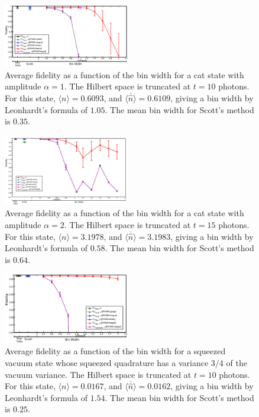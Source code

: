 \documentclass[
reprint,
superscriptaddress,
showpacs,
amsmath,
amssymb,
aps,
pra,
longbibliography
]{revtex4-1}
\begin{document}
\begin{figure}
  \includegraphics[width=0.49\textwidth]{catstate-alpha=1-10photons.eps}
  \caption{Average fidelity as a function of the bin width for a cat
    state with amplitude $\alpha = 1$. The Hilbert space is truncated
    at $t=10$ photons. For this state, $\langle n \rangle = 0.6093$, and 
    $\overline{\langle \hat{n} \rangle}=0.6109$, giving a bin width by
    Leonhardt's formula of $1.05$. The mean bin width for Scott's method 
    is $0.35$.}
  \label{fig-Fidelity_vs_binwidth_catstate_Mph_10_alpha_1}
\end{figure}

\begin{figure}
  \includegraphics[width=0.49\textwidth]{catstate-alpha=2-15photons.eps}
  \caption{Average fidelity as a function of the bin width for a cat
    state with amplitude $\alpha = 2$. The Hilbert space is truncated
    at $t=15$ photons. For this state, $\langle n \rangle = 3.1978$, and 
    $\overline{\langle \hat{n} \rangle}=3.1983$, giving a bin width by
    Leonhardt's formula of $0.58$.  The mean bin width for Scott's
    method is $0.64$.}
  \label{fig-Fid_vs_binwidth_catstate_alpha_2_Mph_15}
\end{figure}

\begin{figure}
  \includegraphics[width=0.49\textwidth]{squeezedvacuum-10photons-var=075.eps}
  \caption{Average fidelity as a function of the bin width for a
    squeezed vacuum state whose squeezed quadrature has a variance 3/4
    of the vacuum variance. The Hilbert space is truncated at $t=10$
    photons. For this state, $\langle n \rangle = 0.0167$, and
    $\overline{\langle \hat{n} \rangle}=0.0162$, giving a bin width by
    Leonhardt's formula of $1.54$.  The mean bin width for Scott's
    method is $0.25$.}
  \label{fig-squeezed_vacuum_variance_075_Mph_10}
\end{figure}
\end{document}

